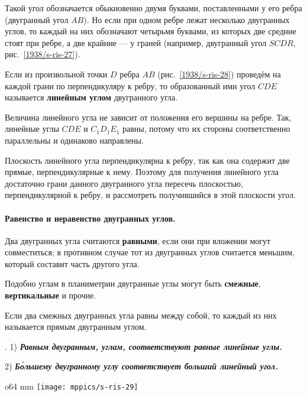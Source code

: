 Такой угол обозначается обыкновенно двумя буквами, поставленными у его ребра (двугранный угол $AB$).
Но если при одном ребре лежат несколько двугранных углов, то каждый на них обозначают четырьмя буквами, из которых две средние стоят при ребре, а две крайние — у граней (например, двугранный угол $SCDR$, рис.~\ref{1938/s-ris-27}).

Если из произвольной точки $D$ ребра $AB$ (рис.~\ref{1938/s-ris-28}) проведём на каждой грани по перпендикуляру к ребру, то образованный ими угол $CDE$ называется \textbf{линейным углом} двугранного угла.

Величина линейного угла не зависит от положения его вершины на ребре.
Так, линейные углы $CDE$ и $C_1D_1E_1$ равны, потому что их стороны соответственно параллельны и одинаково направлены.

Плоскость линейного угла перпендикулярна к ребру, так как она содержит две прямые, перпендикулярные к нему.
Поэтому для получения линейного угла достаточно грани данного двугранного угла пересечь плоскостью, перпендикулярной к ребру, и рассмотреть получившийся в этой плоскости угол.

\paragraph{Равенство и неравенство двугранных углов.}\label{1938/s39}
Два двугранных угла считаются \textbf{равными}, если они при вложении могут совместиться;
в противном случае тот из двугранных углов считается меньшим, который составит часть другого угла.

Подобно углам в планиметрии двугранные углы могут быть \textbf{смежные}, \textbf{вертикальные} и прочие.

Если два смежных двугранных угла равны между собой, то каждый из них называется прямым двугранным углом.

\medskip

.
1) \textbf{\emph{Равным двугранным, углам, соответствуют равные линейные углы.}}

2) \textbf{\emph{Б\'{о}льшему двугранному углу соответствует больший линейный угол.}}

\begin{wrapfigure}{o}{64 mm}
\centering
\texttt{[image: mppics/s-ris-29]}
\caption{}\label{1938/s-ris-29}
\end{wrapfigure}

